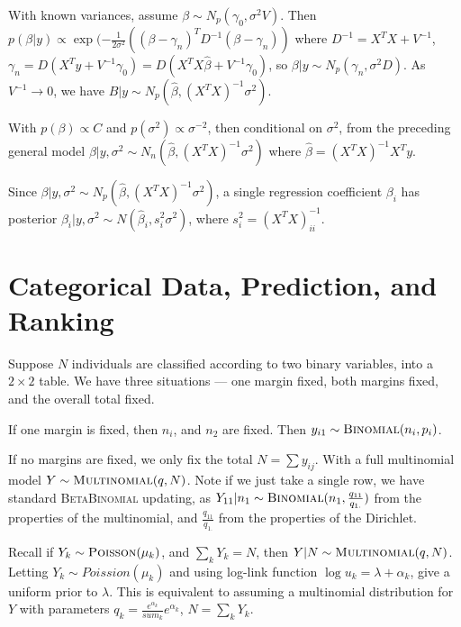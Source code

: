With known variances, assume $\beta \sim N_{p}(\gamma_{0}, \sigma^{2}
V)$.  Then $p(\beta | y) \propto \exp(-\frac{1}{2 \sigma^{2}} ((\beta -
\gamma_{n})^{T} D^{-1} (\beta - \gamma_{n}))$ where $D^{-1} = X^{T} X
+ V^{-1}$, $\gamma_{n} = D(X^{T} y + V^{-1} \gamma_{0}) = D(X^{T} X
\hat \beta + V^{-1} \gamma_{0})$, so $\beta | y \sim N_{p}(\gamma_{n},
\sigma^{2} D)$.  As $V^{-1} \rightarrow 0$, we have $B|y \sim
N_{p}(\hat \beta, (X^{T} X)^{-1} \sigma^{2})$.

With $p(\beta) \propto C$ and $p(\sigma^{2}) \propto \sigma^{-2}$, then
conditional on $\sigma^{2}$, from the preceding general model $\beta |
y, \sigma^{2} \sim N_{n}(\hat \beta, (X^{T} X)^{-1} \sigma^{2})$ where
$\hat \beta = (X^{T} X)^{-1} X^{T} y$.

Since $\beta | y, \sigma^{2} \sim N_{p}(\hat \beta, (X^{T} X)^{-1}
\sigma^{2})$, a single regression coefficient $\beta_{i}$ has
posterior $\beta_{i} | y, \sigma^{2} \sim N(\hat \beta_{i}, s_{i}^{2}
\sigma^{2})$, where $s_{i}^{2} = (X^{T} X)^{-1}_{ii}$.


\section{Categorical Data, Prediction, and Ranking}
\label{sec:categ-data-pred}

Suppose $N$ individuals are classified according to two binary
variables, into a $2 \times 2$ table. We have three situations --- one
margin fixed, both margins fixed, and the overall total fixed.

If one margin is fixed, then $n_{i}$, and $n_{2}$ are fixed. Then
$y_{i1} \sim \textsc{Binomial}(n_{i}, p_{i})$.

If no margins are fixed, we only fix the total $N = \sum y_{ij}$. With
a full multinomial model $Y \sim \textsc{Multinomial}(q, N)$. Note if
we just take a single row, we have standard \textsc{BetaBinomial}
updating, as $Y_{11} | n_{1} \sim \textsc{Binomial}(n_{1},
\frac{q_{11}}{q_{1.}} )$ from the properties of the multinomial, and
$\frac{q_{11}}{q_{1.}}$ from the properties of the Dirichlet.

\begin{defn}
  \label{sec:categ-data-pred-1}
  Recall if $Y_{k} \sim \textsc{Poisson}(\mu_{k})$, and $\sum_{k}^{}
  Y_{k} = N$, then $Y|N \sim \textsc{Multinomial}(q, N)$. Letting
  $Y_{k} \sim Poission(\mu_{k})$ and using log-link function $\log
  u_{k} = \lambda + \alpha_{k}$, give a uniform prior to $\lambda$.
  This is equivalent to assuming a multinomial distribution for $Y$
  with parameters $q_{k} = \frac{e^{\alpha_{k}}}{sum_{k}}
  e^{\alpha_{k}}$, $N = \sum_{k}^{} Y_{k}$.
\end{defn}

